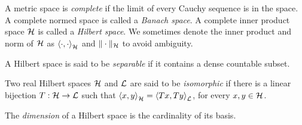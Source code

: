 A metric space is \textit{complete} if the limit of every Cauchy sequence is in the space.
A complete normed space is called a \textit{Banach space}.
A complete inner product space \(\mathcal{H}\) is called a \textit{Hilbert space}.
We sometimes denote the inner product and norm of \(\mathcal{H}\) as \(\left\langle \cdot, \cdot \right\rangle_{\mathcal{H}}\) and \(\|\cdot\|_{\mathcal{H}}\) to avoid ambiguity.

A Hilbert space is said to be \textit{separable} if it contains a dense countable subset.

\def\L{\hilbert{L}}
Two real Hilbert spaces \(\mathcal{H}\) and \(\L\) are said to be \textit{isomorphic} if there is a linear bijection \(T : \H \to \L\) such that
    \(\ipt{x,y}_{\H} = \ipt{Tx, Ty}_{\L}\),
for every \(x, y \in \mathcal{H}\).

The \textit{dimension} of a Hilbert space is the cardinality of its basis.